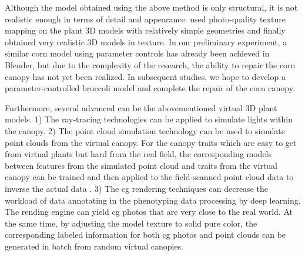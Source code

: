 Although the model obtained using the above method is only structural, it is not realistic enough in terms of detail and appearance. \citet{mikami_hidden_2022} used photo-quality texture mapping on the plant 3D models with relatively simple geometries and finally obtained very realistic 3D models in texture. In our preliminary experiment, a similar corn model using parameter controls has already been achieved in Blender, but due to the complexity of the research, the ability to repair the corn canopy has not yet been realized. In subsequent studies, we hope to develop a parameter-controlled broccoli model and complete the repair of the corn canopy.

Furthermore, several advanced  can be  the abovementioned virtual 3D plant models. 1) The ray-tracing technologies can be applied to simulate lights within the canopy. 
2) The point cloud simulation technology can be used to simulate point clouds from the virtual canopy. For the canopy traits which are easy to get from virtual plants but hard from the real field, the corresponding models between features from the simulated point cloud and traits from the virtual canopy can be trained and then applied to the field-scanned point cloud data to inverse the actual data \citep{liu_estimating_2017}. 3) The \gls{cg} rendering techniques can decrease the workload of data annotating in the phenotyping data processing by deep learning. The rending engine can yield \gls{cg} photos that are very close to the real world. At the same time, by adjusting the model texture to solid pure color, the corresponding labeled information for both \gls{cg} photos \citep{mikami_hidden_2022} and point clouds \citep{chaudhury_3d_2020} can be generated in batch from random virtual canopies.

\subsection{}

